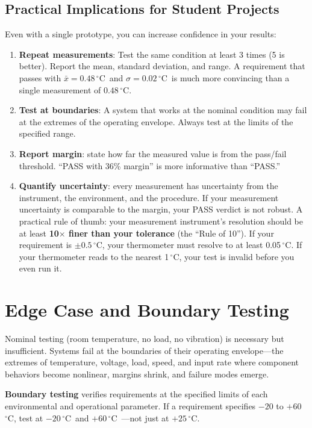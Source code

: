 \documentclass[11pt,letterpaper,twoside,openany]{book}
\newcommand{\degC}{\ensuremath{{}^{\circ}\text{C}}}
\begin{document}
\subsection{Practical Implications for Student Projects}
Even with a single prototype, you can increase confidence in your results:
\begin{enumerate}[leftmargin=1.5em]
\item \textbf{Repeat measurements}: Test the same condition at least 3 times (5 is better). Report the mean, standard deviation, and range. A requirement that passes with $\bar{x} = 0.48$\,\degC\ and $\sigma = 0.02$\,\degC\ is much more convincing than a single measurement of $0.48$\,\degC.
\item \textbf{Test at boundaries}: A system that works at the nominal condition may fail at the extremes of the operating envelope. Always test at the limits of the specified range.
\item \textbf{Report margin}: state how far the measured value is from the pass/fail threshold. ``PASS with 36\% margin'' is more informative than ``PASS.''
\item \textbf{Quantify uncertainty}: every measurement has uncertainty from the instrument, the environment, and the procedure. If your measurement uncertainty is comparable to the margin, your PASS verdict is not robust. A practical rule of thumb: your measurement instrument's resolution should be at least \textbf{10$\times$ finer than your tolerance} (the ``Rule of 10''). If your requirement is $\pm 0.5$\,\degC, your thermometer must resolve to at least 0.05\,\degC. If your thermometer reads to the nearest 1\,\degC, your test is invalid before you even run it.
\end{enumerate}

\FloatBarrier
\section{Edge Case and Boundary Testing}
Nominal testing (room temperature, no load, no vibration) is necessary but insufficient. Systems fail at the boundaries of their operating envelope---the extremes of temperature, voltage, load, speed, and input rate where component behaviors become nonlinear, margins shrink, and failure modes emerge.

\textbf{Boundary testing} verifies requirements at the specified limits of each environmental and operational parameter. If a requirement specifies $-20$ to $+60$\,\degC, test at $-20$\,\degC\ and $+60$\,\degC\ ---not just at $+25$\,\degC.
\end{document}
